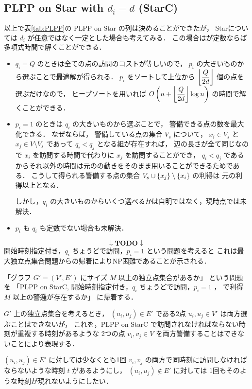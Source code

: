 \subsection{PLPP on Star with $d_i = d$ (StarC)}
以上で表\ref{tab:PLPP}の PLPP on Star の列は決めることができたが，
Starについては $d_i$ が任意ではなく一定とした場合も考えてみる．
この場合は\shuki が定数ならば多項式時間で解くことができる．

\begin{itemize}
\item 
$q_i = Q$ のときは全ての点の訪問のコストが等しいので，
$p_i$ の大きいものから選ぶことで最適解が得られる．
$p_i$ をソートして上位から $\left\lfloor{\dfrac{Q}{2d}}\right\rfloor$ 個の点を選ぶだけなので，
ヒープソートを用いれば $O\left(n + \left\lfloor{\dfrac{Q}{2d}}\right\rfloor \log n\right)$ の時間で解くことができる．

\item 
$p_i = 1$ のときは $q_i$ の大きいものから選ぶことで，
警備できる点の数を最大化できる．
なぜならば，
警備している点の集合 $V_s$ について，
$x_i \in V_s$ と $x_j \in V \setminus V_s$ であって
$q_i < q_j$ となる組が存在すれば，
辺の長さが全て同じなので $x_i$ を訪問する時間で代わりに $x_j$ を訪問することができ，
$q_i < q_j$ であるからそれ以外の時間は元の\server の動きをそのまま用いることができるためである．
こうして得られる警備する点の集合 $V_s \cup \left\{{ x_j}\right\} \setminus \left\{{ x_i }\right\}$ の利得は
元の利得以上となる．

しかし，$q_i$ の大きいものからいくつ選べるかは自明ではなく，現時点では未解決．

\item 
$p_i$ も $q_i$ も定数でない場合も未解決．
\end{itemize}



\[ \downarrow \textbf{TODO} \downarrow \]
開始時刻指定付き，$q_i$ ちょうどで訪問，$p_i = 1$ という問題を考えると
これは最大独立点集合問題からの帰着によりNP困難であることが示される．

「グラフ $G' = (V',E')$ にサイズ $M$ 以上の独立点集合があるか」
という問題を
「PLPP on StarC, 開始時刻指定付き，$q_i$ ちょうどで訪問，$p_i = 1$ ，
で利得 $M$ 以上の警邏が存在するか」
に帰着する．

$G'$ 上の独立点集合を考えるとき，
$(u_i, u_j) \in E'$ である2点 $u_i, u_j \in V'$ は両方選ぶことはできないが，
これを，PLPP on StarC で訪問されなければならない時刻が重複する時刻があるような
2つの点 $v_i, v_j \in V$ を両方警備することはできないことにより表現する．

$(u_i, u_j) \in E'$ に対しては少なくとも1回
$v_i, v_j$ の両方で同時刻に訪問しなければならないような時刻 $t$ があるようにし，
$(u_i, u_j) \not\in E'$ に対しては
1回もそのような時刻が現れないようにしたい．

